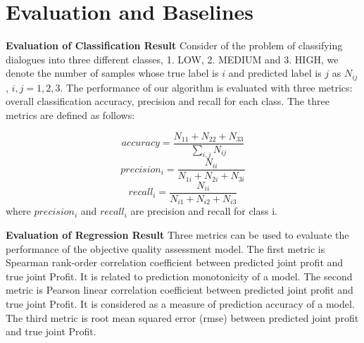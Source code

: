 \documentclass[11pt]{article} %
\begin{document}
\section{Evaluation and Baselines} %
\textbf{Evaluation of Classification Result}
Consider of the problem of classifying dialogues into three different classes, 1. LOW, 2. MEDIUM and 3. HIGH, we denote the number of samples whose true label is $i$ and predicted label is $j$ as $N_{ij}$, $i,j=1,2,3$. The performance of our algorithm is evaluated with three metrics: overall classification accuracy, precision and recall for each class. The three metrics are defined as follows:

\begin{equation*}
accuracy = \frac{N_{11}+N_{22}+N_{33}}{\sum_{i,j}N_{ij}}
\end{equation*}
\begin{equation*}
precision_{i}=\frac{N_{ii}}{N_{1i}+N_{2i}+N_{3i}}
\end{equation*}
\begin{equation*}
recall_{i}=\frac{N_{ii}}{N_{i1}+N_{i2}+N_{i3}}
\end{equation*}
where $precision_i$ and $recall_i$ are precision and recall for class i.

\textbf{Evaluation of Regression Result}
Three metrics can be used to evaluate the performance of the objective quality assessment model. The first metric is Spearman rank-order correlation coefficient between predicted joint profit and true joint Profit. It is related to prediction monotonicity of a model. The second metric is Pearson linear correlation coefficient between predicted joint profit and true joint Profit. It is considered as a measure of prediction accuracy of a model. The third metric is root mean squared error (rmse) between predicted joint profit and true joint Profit.
\end{document}
